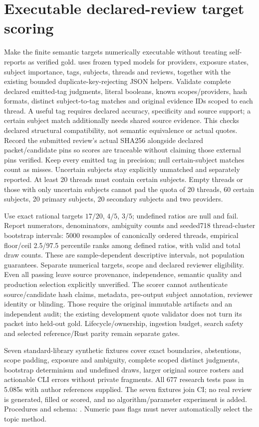 \documentclass[11pt]{article}
\begin{document}
\section{Executable declared-review target scoring}
Make the finite semantic targets numerically executable without treating
self-reports as verified gold.  uses frozen
typed models for providers, exposure states, subject importance, tags, subjects,
threads and reviews, together with the
existing bounded duplicate-key-rejecting JSON helpers. Validate complete declared
emitted-tag judgments, literal booleans, known scopes/providers, hash formats,
distinct subject-to-tag matches and original evidence IDs scoped to each thread.
A useful tag requires declared accuracy, specificity and source support; a
certain subject match additionally needs shared source evidence. This checks
declared structural compatibility, not semantic equivalence or actual quotes.
Record the submitted review's actual SHA256 alongside declared packet/candidate
pins so scores are traceable without claiming those external pins verified.
Keep every emitted tag in precision; null certain-subject matches count as
misses. Uncertain subjects stay explicitly unmatched and separately reported.
At least 20 threads must contain certain subjects. Empty threads or those with
only uncertain subjects cannot pad the quota of 20 threads, 60 certain subjects,
20 primary subjects, 20 secondary subjects and two providers.

Use exact rational targets $17/20$, $4/5$, $3/5$; undefined ratios are null and fail.
Report numerators, denominators, ambiguity counts and seeded718 thread-cluster
bootstrap intervals: 5000 resamples of canonically ordered threads, empirical
floor/ceil 2.5/97.5 percentile ranks among defined ratios, with valid and total
draw counts. These are
sample-dependent descriptive intervals, not population guarantees. Separate
numerical targets, scope and declared reviewer eligibility. Even all passing
leave source provenance, independence, semantic quality and production selection
explicitly unverified. The scorer cannot authenticate source/candidate hash
claims, metadata, pre-output subject annotation, reviewer identity or blinding.
Those require the original immutable artifacts and an independent audit; the
existing development quote validator does not turn its packet into held-out gold.
Lifecycle/ownership, ingestion budget, search safety and selected reference/Rust
parity remain separate gates.

Seven standard-library synthetic fixtures cover exact boundaries, abstentions,
scope padding, exposure and ambiguity, complete scoped distinct judgments,
bootstrap determinism and undefined draws, larger original source rosters and
actionable CLI errors without private fragments. All 677 research tests pass in
5.085s with author
references supplied. The seven fixtures join CI; no real review is generated,
filled or scored, and no algorithm/parameter experiment is added. Procedures and
schema: . Numeric pass flags must
never automatically select the topic method.
\end{document}
